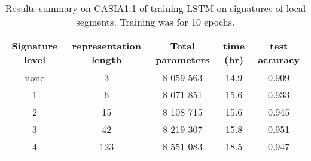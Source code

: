 \iffalse
\begin{figure}
\begin{tikzpicture}
\node (inp) {$(\text{feature length})\times (\text{number of segments})$ input};
\node[draw,rectangle,above of=inp] (l1) {LSTM};
\node[draw,circle,right=0mm of l1] {$\dagger$};
\node[above of = l1] (o1) {\rlap{\ $512\times(\text{number of segments})$}};
\node[draw,rectangle,above of=o1] (l2) {LSTM (2099200 parameters)};
\node[draw,cloud ignores aspect,cloud,right=0mm of l2,inner sep=0mm] {2099200};
\node[above of = l2] (o2) {\rlap{\ $512\times(\text{number of segments})$}};
\node[draw,rectangle,above of=o2] (l3) {forget all but last timestep};
\node[above of =l3] (o3) {\rlap{\ 512}};
\node[draw,rectangle,above of=o3] (l4) {dense layer};
\node[draw,circle,right=0mm of l4,inner sep=0mm] {1926315};
\node[draw,rectangle,above=0mm of l4] (s4) {softmax};
\node[above of = s4] (o4) {3755 output};
\draw[-Latex] (inp)--(l1);
\draw[-Latex] (l1)--(l2);
\draw[-Latex] (l2)--(l3);
\draw[-Latex] (l3)--(l4);
\draw[-Latex] (s4)--(o4);
\end{tikzpicture}
\caption[Schematic diagram of  LSTM network architecture for signatures of local segments.]{\label{fig:logsigpen}Schematic diagram of  LSTM network architecture for signatures of local segments. 
Numbers of parameters are indicated in circles.}
\end{figure}
\fi


\begin{table}
\centering
    \begin{tabular}{ccccc}
      \hline
      Signature level&\multicolumn{1}{p{2.5cm}}{\centering representation length}&\multicolumn{1}{p{2cm}}{\centering Total parameters}&time (hr)&test accuracy\\
      \hline
      none&3  &8 059 563&14.9&0.909\\
      1   &6  &8 071 851&15.6&0.933\\
      2   &15 &8 108 715&15.6&0.945\\
      3   &42 &8 219 307&15.8&0.951\\
      4   &123&8 551 083&18.5&0.947\\
      \hline
    \end{tabular}
  \caption[Results for signatures of local segments]{Results summary on CASIA1.1 of training LSTM on signatures of local segments. Training was for 10 epochs.}
  \label{tab:logsigpenres}
\end{table}

